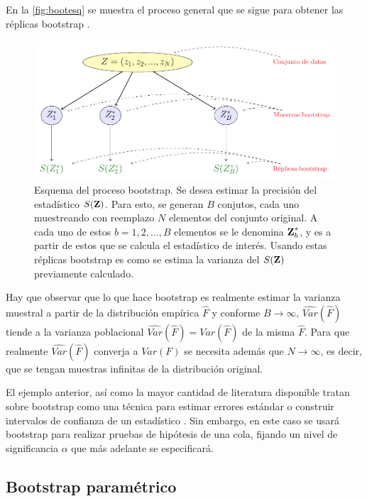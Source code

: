 En la \autoref{fig:bootesq} se muestra el proceso general que se sigue para obtener las réplicas bootstrap \cite{Hastie2001}.

\begin{figure}[tp]
  \centerline
  {\includegraphics[width=1.1\linewidth]{gfx/chap4/untitled}}        
  \caption[Esquema del proceso bootstrap.]{Esquema del proceso bootstrap. Se desea estimar la precisión del estadístico $S(\textbf{Z})$. Para esto, se generan $B$ conjutos, cada uno muestreando con reemplazo $N$ elementos del conjunto original. A cada uno de estos $b = 1, 2, ..., B$ elementos se le denomina $\textbf{Z}^{*}_b$, y es a partir de estos que se calcula el estadístico de interés. Usando estas réplicas bootstrap es como se estima la varianza del $S(\textbf{Z})$ previamente calculado.}
  \label{fig:bootesq}
\end{figure}

Hay que observar que lo que hace bootstrap es realmente estimar la varianza muestral a partir de la distribución empírica $\hat F$ y conforme $B \rightarrow \infty$, $\widehat{Var}(\hat F)$ tiende a la varianza poblacional $\widehat{Var}(\hat F) = {Var}(\hat F)$ de la misma $\hat F$. Para que realmente $\widehat{Var}(\hat F)$ converja a  ${Var}(F)$ se necesita además que $N \rightarrow \infty$, es decir, que se tengan muestras infinitas de la distribución original.

El ejemplo anterior, así como la mayor cantidad de literatura disponible tratan sobre bootstrap como una técnica para estimar errores estándar o construir intervalos de confianza de un estadístico \cite{MacKinnon2007}. Sin embargo, en este caso se usará bootstrap para realizar pruebas de hipótesis de una cola, fijando un nivel de significancia $\alpha$ que más adelante se especificará.

\subsection{Bootstrap paramétrico}

